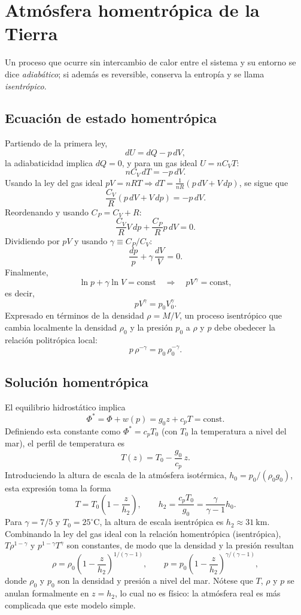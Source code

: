 \figuraCompresibilidadFluidos

\section{Atmósfera homentrópica de la Tierra}

Un proceso que ocurre sin intercambio de calor entre el sistema y su entorno se dice \emph{adiabático}; si además es reversible, conserva la entropía y se llama \emph{isentrópico}.

\subsection{Ecuación de estado homentrópica}

Partiendo de la primera ley,
$$ dU = dQ - p\,dV, $$
la adiabaticidad implica $dQ = 0$, y para un gas ideal $U = nC_V T$:
$$ nC_V\,dT = -p\,dV. $$
Usando la ley del gas ideal $pV = nRT \Rightarrow dT = \frac{1}{nR}(p\,dV + V\,dp)$, se sigue que
$$ \frac{C_V}{R}(p\,dV + V\,dp) = -p\,dV. $$
Reordenando y usando $C_P = C_V + R$:
$$ \frac{C_V}{R}V\,dp + \frac{C_P}{R}p\,dV = 0. $$
Dividiendo por $pV$ y usando $\gamma \equiv C_P/C_V$:
$$ \frac{dp}{p} + \gamma\,\frac{dV}{V} = 0. $$
Finalmente,
$$ \ln p + \gamma \ln V = \mathrm{const} \quad\Rightarrow\quad pV^{\gamma} = \mathrm{const}, $$
es decir,
$$ pV^{\gamma} = p_0 V_0^{\gamma}. $$
Expresado en términos de la densidad $\rho = M/V$, un proceso isentrópico que cambia localmente la densidad $\rho_0$ y la presión $p_0$ a $\rho$ y $p$ debe obedecer la relación politrópica local:
$$ p\,\rho^{-\gamma} = p_0\,\rho_0^{-\gamma}. $$

\subsection{Solución homentrópica}

El equilibrio hidrostático implica
$$ \Phi^{*} = \Phi + w(p) = g_0 z + c_p T = \mathrm{const}. $$
Definiendo esta constante como $\Phi^{*} = c_p T_0$ (con $T_0$ la temperatura a nivel del mar), el perfil de temperatura es
$$ T(z) = T_0 - \frac{g_0}{c_p}\,z. $$
Introduciendo la altura de escala de la atmósfera isotérmica, $h_0 = p_0/(\rho_0 g_0)$, esta expresión toma la forma
$$ T = T_0\left(1 - \frac{z}{h_2}\right), \qquad h_2 = \frac{c_p T_0}{g_0} = \frac{\gamma}{\gamma-1}h_0. $$
Para $\gamma = 7/5$ y $T_0 = 25^\circ\mathrm{C}$, la altura de escala isentrópica es $h_2 \approx 31\ \mathrm{km}$. Combinando la ley del gas ideal con la relación homentrópica (isentrópica), $T\rho^{1-\gamma}$ y $p^{1-\gamma}T^{\gamma}$ son constantes, de modo que la densidad y la presión resultan
$$ \rho = \rho_0\left(1 - \frac{z}{h_2}\right)^{1/(\gamma-1)}, \qquad p = p_0\left(1 - \frac{z}{h_2}\right)^{\gamma/(\gamma-1)}, $$
donde $\rho_0$ y $p_0$ son la densidad y presión a nivel del mar. Nótese que $T$, $\rho$ y $p$ se anulan formalmente en $z = h_2$, lo cual no es físico: la atmósfera real es más complicada que este modelo simple.

